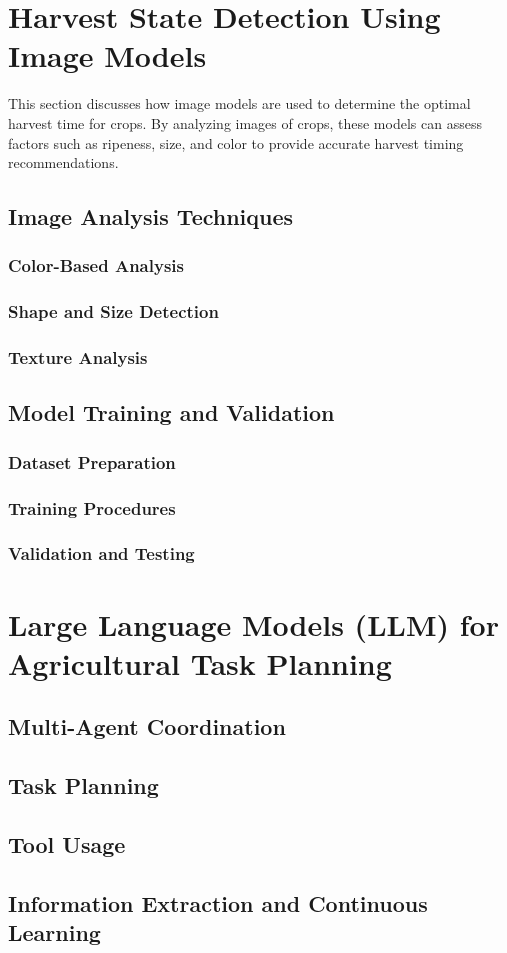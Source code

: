 \chapter{Harvest State Detection Using Image Models}
This section discusses how image models are used to determine the optimal harvest time for crops. By analyzing images of crops, these models can assess factors such as ripeness, size, and color to provide accurate harvest timing recommendations.

\section{Image Analysis Techniques}
\subsection{Color-Based Analysis}
\subsection{Shape and Size Detection}
\subsection{Texture Analysis}

\section{Model Training and Validation}
\subsection{Dataset Preparation}
\subsection{Training Procedures}
\subsection{Validation and Testing}

\chapter{Large Language Models (LLM) for Agricultural Task Planning}
\section{Multi-Agent Coordination}
\section{Task Planning}
\section{Tool Usage}
\section{Information Extraction and Continuous Learning}
